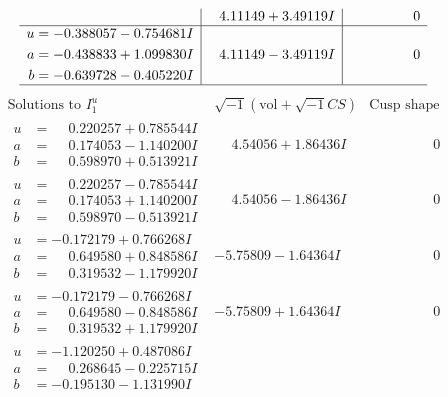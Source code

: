 \documentclass[1p]{elsarticle_modified}
\theoremstyle{definition}
\newcommand{\I}{\sqrt{-1}}
\begin{document}
$$\begin{array}{c|c|c}
 & \phantom{-}4.11149 + 3.49119 I & \phantom{-0.000000 } 0 \\ \hline\begin{aligned}
u &= -0.388057 - 0.754681 I \\
a &= -0.438833 + 1.099830 I \\
b &= -0.639728 - 0.405220 I\end{aligned}
 & \phantom{-}4.11149 - 3.49119 I & \phantom{-0.000000 } 0\\
 \hline 
 \end{array}$$\newpage$$\begin{array}{c|c|c}  
\text{Solutions to }I^u_{1}& \I (\text{vol} + \sqrt{-1}CS) & \text{Cusp shape}\\
 \hline 
\begin{aligned}
u &= \phantom{-}0.220257 + 0.785544 I \\
a &= \phantom{-}0.174053 - 1.140200 I \\
b &= \phantom{-}0.598970 + 0.513921 I\end{aligned}
 & \phantom{-}4.54056 + 1.86436 I & \phantom{-0.000000 } 0 \\ \hline\begin{aligned}
u &= \phantom{-}0.220257 - 0.785544 I \\
a &= \phantom{-}0.174053 + 1.140200 I \\
b &= \phantom{-}0.598970 - 0.513921 I\end{aligned}
 & \phantom{-}4.54056 - 1.86436 I & \phantom{-0.000000 } 0 \\ \hline\begin{aligned}
u &= -0.172179 + 0.766268 I \\
a &= \phantom{-}0.649580 + 0.848586 I \\
b &= \phantom{-}0.319532 - 1.179920 I\end{aligned}
 & -5.75809 - 1.64364 I & \phantom{-0.000000 } 0 \\ \hline\begin{aligned}
u &= -0.172179 - 0.766268 I \\
a &= \phantom{-}0.649580 - 0.848586 I \\
b &= \phantom{-}0.319532 + 1.179920 I\end{aligned}
 & -5.75809 + 1.64364 I & \phantom{-0.000000 } 0 \\ \hline\begin{aligned}
u &= -1.120250 + 0.487086 I \\
a &= \phantom{-}0.268645 - 0.225715 I \\
b &= -0.195130 - 1.131990 I\end{aligned}

\end{array}$$
\end{document}
